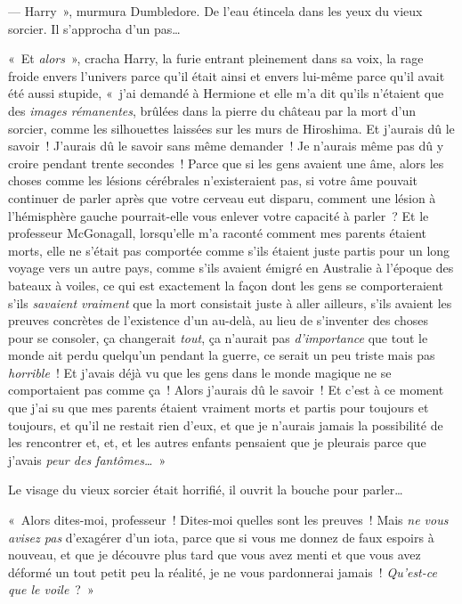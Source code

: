 --- Harry~», murmura Dumbledore. De l'eau étincela dans les yeux du vieux sorcier. Il s'approcha d'un pas…

«~Et \emph{alors}~», cracha Harry, la furie entrant pleinement dans sa voix, la rage froide envers l'univers parce qu'il était ainsi et envers lui-même parce qu'il avait été aussi stupide, «~j'ai demandé à Hermione et elle m'a dit qu'ils n'étaient que des \emph{images rémanentes}, brûlées dans la pierre du château par la mort d'un sorcier, comme les silhouettes laissées sur les murs de Hiroshima. Et j'aurais dû le savoir~! J'aurais dû le savoir sans même demander~! Je n'aurais même pas dû y croire pendant trente secondes~! Parce que si les gens avaient une âme, alors les choses comme les lésions cérébrales n'existeraient pas, si votre âme pouvait continuer de parler après que votre cerveau eut disparu, comment une lésion à l'hémisphère gauche pourrait-elle vous enlever votre capacité à parler~? Et le professeur McGonagall, lorsqu'elle m'a raconté comment mes parents étaient morts, elle ne s'était pas comportée comme s'ils étaient juste partis pour un long voyage vers un autre pays, comme s'ils avaient émigré en Australie à l'époque des bateaux à voiles, ce qui est exactement la façon dont les gens se comporteraient s'ils \emph{savaient vraiment} que la mort consistait juste à aller ailleurs, s'ils avaient les preuves concrètes de l'existence d'un au-delà, au lieu de s'inventer des choses pour se consoler, ça changerait \emph{tout}, ça n'aurait pas \emph{d'importance} que tout le monde ait perdu quelqu'un pendant la guerre, ce serait un peu triste mais pas \emph{horrible}~! Et j'avais déjà vu que les gens dans le monde magique ne se comportaient pas comme ça~! Alors j'aurais dû le savoir~! Et c'est à ce moment que j'ai su que mes parents étaient vraiment morts et partis pour toujours et toujours, et qu'il ne restait rien d'eux, et que je n'aurais jamais la possibilité de les rencontrer et, et, et les autres enfants pensaient que je pleurais parce que j'avais \emph{peur des fantômes…}~»

Le visage du vieux sorcier était horrifié, il ouvrit la bouche pour parler…

«~Alors dites-moi, professeur~! Dites-moi quelles sont les preuves~! Mais \emph{ne vous avisez pas} d'exagérer d'un iota, parce que si vous me donnez de faux espoirs à nouveau, et que je découvre plus tard que vous avez menti et que vous avez déformé un tout petit peu la réalité, je ne vous pardonnerai jamais~! \emph{Qu'est-ce que le voile}~?~»

